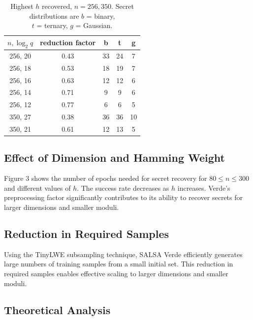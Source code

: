\documentclass{article}
\begin{document}
\begin{table}[h]
    \centering
    \begin{tabular}{|c|c|c|c|c|}
        \hline
        \textbf{\( n, \log_2 q \)} & \textbf{reduction factor} & \textbf{b} & \textbf{t} & \textbf{g} \\
        \hline
        256, 20 & 0.43 & 33 & 24 & 7 \\
        256, 18 & 0.53 & 18 & 19 & 7 \\
        256, 16 & 0.63 & 12 & 12 & 6 \\
        256, 14 & 0.71 & 9 & 9 & 6 \\
        256, 12 & 0.77 & 6 & 6 & 5 \\
        \hline
        350, 27 & 0.38 & 36 & 36 & 10 \\
        350, 21 & 0.61 & 12 & 13 & 5 \\
        \hline
    \end{tabular}
    \caption{Highest \( h \) recovered, \( n = 256, 350 \). Secret distributions are \( b \) = binary, \\ \( t \) = ternary, \( g \) = Gaussian.}
\end{table}

\subsection*{Effect of Dimension and Hamming Weight}

Figure 3 shows the number of epochs needed for secret recovery for \( 80 \leq n \leq 300 \) and different values of \( h \). The success rate decreases as \( h \) increases. Verde's preprocessing factor significantly contributes to its ability to recover secrets for larger dimensions and smaller moduli.

\subsection*{Reduction in Required Samples}

Using the TinyLWE subsampling technique, SALSA Verde efficiently generates large numbers of training samples from a small initial set. This reduction in required samples enables effective scaling to larger dimensions and smaller moduli.

\subsection*{Theoretical Analysis}
\end{document}
